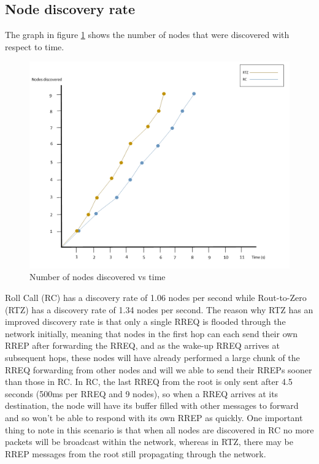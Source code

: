     \subsection{Node discovery rate}
    The graph in figure \ref{fig:dsc_rate} shows the number of nodes that were
    discovered with respect to time.

    \FloatBarrier
    \begin{figure}[ht]
      \includegraphics[width=\textwidth]{Images/chapter5/dsc_rate.png}
      \caption{Number of nodes discovered vs time}
      \label{fig:dsc_rate}
    \end{figure}
    \FloatBarrier

    Roll Call (RC) has a discovery rate of 1.06 nodes per second while Rout-to-Zero (RTZ)
    has a discovery rate of 1.34 nodes per second. The reason why RTZ has an improved
    discovery rate is that only a single RREQ is flooded through the network initially,
    meaning that nodes in the first hop can each send their own RREP after forwarding
    the RREQ, and as the wake-up RREQ arrives at subsequent hops, these nodes will
    have already performed a large chunk of the RREQ forwarding from other nodes
    and will we able to send their RREPs sooner than those in RC. In RC, the last
    RREQ from the root is only sent after 4.5 seconds (500ms per RREQ and 9 nodes),
    so when a RREQ arrives at its destination, the node will have its buffer filled
    with other messages to forward and so won't be able to respond with its own
    RREP as quickly. One important thing to note in this scenario is that when
    all nodes are discovered in RC no more packets will be broadcast within the network,
    whereas in RTZ, there may be RREP messages from the root still propagating
    through the network.


